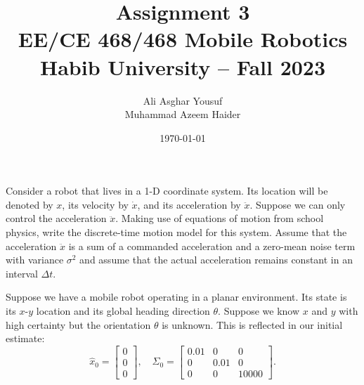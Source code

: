 \documentclass[answers]{exam}
\title{Assignment 3\\ EE/CE 468/468 Mobile Robotics\\ Habib University -- Fall 2023}
\author{Ali Asghar Yousuf \\ Muhammad Azeem Haider }
\date{\today}
\begin{document}
\maketitle

\begin{questions}
    \question[20]
    Consider a robot that lives in a 1-D coordinate system. Its location will be denoted by \(x\), its velocity by \(\dot{x}\), and its acceleration by \(\ddot{x}\). Suppose we can only control the acceleration \(\ddot{x}\). Making use of equations of motion from school physics, write the discrete-time motion model for this system. Assume that the acceleration \(\ddot{x}\) is a sum of a commanded acceleration and a zero-mean noise term with variance \(\sigma^2\) and assume that the actual acceleration remains constant in an interval \(\Delta t\).

    \question[20]
    Suppose we have a mobile robot operating in a planar environment. Its state is its \(x\)-\(y\) location and its global heading direction \(\theta\). Suppose we know \(x\) and \(y\) with high certainty but the orientation \(\theta\) is unknown. This is reflected in our initial estimate:
    \[
    \hat{x}_0 = \begin{bmatrix} 0 \\ 0 \\ 0 \end{bmatrix}, \quad
    \Sigma_0 = \begin{bmatrix} 0.01 & 0 & 0 \\ 0 & 0.01 & 0 \\ 0 & 0 & 10000 \end{bmatrix}.
    \]
    \begin{parts}

\end{parts}
\end{questions}
\end{document}
